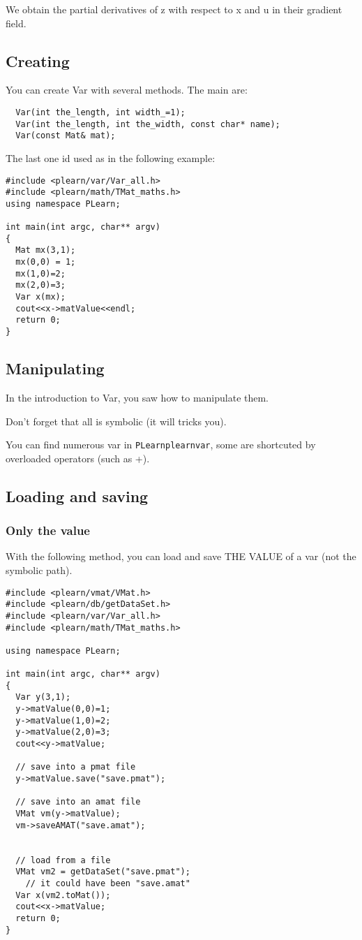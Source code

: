 \documentclass[11pt]{book}
\begin{document}
 We obtain the partial derivatives of z with respect to x and u in their
 gradient field.


\subsection{Creating}

You can create Var with several methods.
The main are:
\begin{verbatim}
  Var(int the_length, int width_=1);
  Var(int the_length, int the_width, const char* name);
  Var(const Mat& mat);
\end{verbatim}

The last one id used as in the following example:
\begin{verbatim}
#include <plearn/var/Var_all.h>
#include <plearn/math/TMat_maths.h>
using namespace PLearn;

int main(int argc, char** argv)
{
  Mat mx(3,1);
  mx(0,0) = 1;
  mx(1,0)=2;
  mx(2,0)=3;
  Var x(mx);
  cout<<x->matValue<<endl;
  return 0;
}
\end{verbatim}

\subsection{Manipulating}

In the introduction to Var, you saw how to manipulate them.

Don't forget that all is symbolic (it will tricks you).

You can find numerous var in \texttt{PLearn\/plearn\/var}, some are shortcuted by overloaded operators (such as +).

\subsection{Loading and saving}

\subsubsection{Only the value}

With the following method, you can load and save THE VALUE of a var (not the symbolic path). 
\begin{verbatim}
#include <plearn/vmat/VMat.h>
#include <plearn/db/getDataSet.h>
#include <plearn/var/Var_all.h>
#include <plearn/math/TMat_maths.h>

using namespace PLearn;

int main(int argc, char** argv)
{
  Var y(3,1);
  y->matValue(0,0)=1;
  y->matValue(1,0)=2;
  y->matValue(2,0)=3;
  cout<<y->matValue;

  // save into a pmat file
  y->matValue.save("save.pmat");

  // save into an amat file
  VMat vm(y->matValue);
  vm->saveAMAT("save.amat");


  // load from a file
  VMat vm2 = getDataSet("save.pmat");
    // it could have been "save.amat"
  Var x(vm2.toMat());
  cout<<x->matValue;
  return 0;
}
\end{verbatim}
\end{document}
